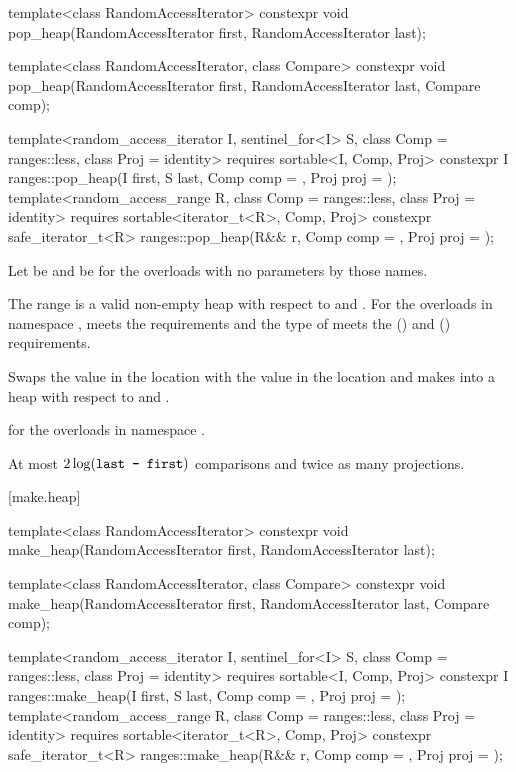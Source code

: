 %
\begin{itemdecl}
template<class RandomAccessIterator>
  constexpr void pop_heap(RandomAccessIterator first, RandomAccessIterator last);

template<class RandomAccessIterator, class Compare>
  constexpr void pop_heap(RandomAccessIterator first, RandomAccessIterator last,
                          Compare comp);

template<random_access_iterator I, sentinel_for<I> S, class Comp = ranges::less,
         class Proj = identity>
  requires sortable<I, Comp, Proj>
  constexpr I
    ranges::pop_heap(I first, S last, Comp comp = {}, Proj proj = {});
template<random_access_range R, class Comp = ranges::less, class Proj = identity>
  requires sortable<iterator_t<R>, Comp, Proj>
  constexpr safe_iterator_t<R>
    ranges::pop_heap(R&& r, Comp comp = {}, Proj proj = {});
\end{itemdecl}

\begin{itemdescr}
\pnum
Let  be 
and  be 
for the overloads with no parameters by those names.

\pnum
\expects
The range 
is a valid non-empty heap with respect to  and .
For the overloads in namespace ,
 meets
the  requirements and
the type of  meets
the  () and
 () requirements.

\pnum
\effects
Swaps the value in the location 
with the value in the location
and makes
into a heap with respect to  and .

\pnum
\returns
{} for the overloads in namespace .

\pnum
\complexity
At most $2 \log(\texttt{last - first})$ comparisons and
twice as many projections.
\end{itemdescr}

[make.heap]{}

%
\begin{itemdecl}
template<class RandomAccessIterator>
  constexpr void make_heap(RandomAccessIterator first, RandomAccessIterator last);

template<class RandomAccessIterator, class Compare>
  constexpr void make_heap(RandomAccessIterator first, RandomAccessIterator last,
                           Compare comp);

template<random_access_iterator I, sentinel_for<I> S, class Comp = ranges::less,
         class Proj = identity>
  requires sortable<I, Comp, Proj>
  constexpr I
    ranges::make_heap(I first, S last, Comp comp = {}, Proj proj = {});
template<random_access_range R, class Comp = ranges::less, class Proj = identity>
  requires sortable<iterator_t<R>, Comp, Proj>
  constexpr safe_iterator_t<R>
    ranges::make_heap(R&& r, Comp comp = {}, Proj proj = {});
\end{itemdecl}

